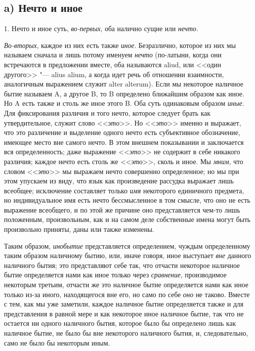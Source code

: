 \subsection[a) Нечто и иное]{a) Нечто и иное}
1. Нечто и иное суть, {\em во-первых}, оба налично
сущие или {\em нечто}.

{\em Во-вторых}, каждое из них есть также
{\em иное}. Безразлично, которое из них мы называем
сначала и лишь потому именуем {\em нечто} (по-латыни,
когда они встречаются в предложении вместе, оба называются aliud, или <<один
другого>> "--- alius alium, а когда идет речь об отношении взаимности,
аналогичным выражением служит alter alterum). Если мы некоторое наличное
бытие называем A, а другое B, то B определено ближайшим образом как иное.
Но A есть также и столь же иное этого B. Оба суть одинаковым образом
{\em иные}. Для фиксирования различия и того нечто,
которое следует брать как утвердительное, служит слово
<<{\em это}>>. Но <<{\em это}>> именно
и выражает, что это различение и выделение одного нечто есть субъективное
обозначение, имеющее место вне самого нечто. В этом внешнем показывании и
заключается вся определенность; даже выражение
<<{\em это}>> не содержит в себе никакого различия;
каждое нечто есть столь же <<{\em это}>>, сколь и иное.
Мы {\em мним}, что словом
<<{\em это}>> мы выражаем нечто совершенно определенное;
но мы при этом упускаем из виду, что язык как произведение рассудка
выражает лишь всеобщее; исключение составляет только
{\em имя} некоторого единичного предмета, но
индивидуальное имя есть нечто бессмысленное в том смысле, что оно не есть
выражение всеобщего, и по этой же причине оно представляется чем-то лишь
положенным, произвольным, как и на самом деле собственные имена могут быть
произвольно приняты, даны или также изменены.

Таким образом, {\em инобытие} представляется
определением, чуждым определенному таким образом наличному бытию, или,
иначе говоря, иное выступает {\em вне} данного
наличного бытия; это представляют себе так, что отчасти некоторое наличное
бытие определяется нами как иное только через
{\em сравнение}, производимое некоторым третьим,
отчасти же это наличное бытие определяется нами как иное только из-за
иного, находящегося вне его, но само по себе
{\em оно} не таково. Вместе с тем, как мы уже заметили,
каждое наличное бытие определяется также и для представления в равной мере
и как некоторое иное наличное бытие, так что не остается ни одного
наличного бытия, которое было бы определено лишь как наличное бытие, не
было бы вне некоторого наличного бытия, и, следовательно, само не было бы
некоторым иным.

